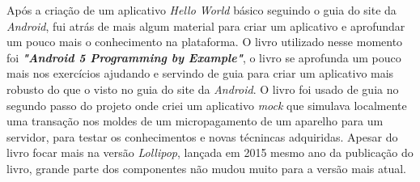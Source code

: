 \documentclass[hidelinks,12pt]{article}
\begin{document}
Ap\'os a cria\c{c}\~ao de um aplicativo \textit{Hello World} b\'asico seguindo o guia do site da \textit{Android}, fui atr\'as de mais algum material para criar um aplicativo e aprofundar um pouco mais o conhecimento na plataforma. O livro \cite{andppe} utilizado nesse momento foi \textbf{\textit{"Android 5 Programming by Example"}}, o livro \cite{andppe} se aprofunda um pouco mais nos exerc\'icios ajudando e servindo de guia para criar um aplicativo mais robusto do que o visto no guia do site da \textit{Android}. O livro \cite{andppe} foi usado de guia no segundo passo do projeto onde criei um aplicativo \textit{mock} que simulava localmente uma transa\c{c}\~ao nos moldes de um micropagamento de um aparelho para um servidor, para testar os conhecimentos e novas t\'ecnincas adquiridas. Apesar do livro \cite{andppe} focar mais na vers\~ao \textit{Lollipop}, lan\c{c}ada em 2015 mesmo ano da publica\c{c}\~ao do livro, grande parte dos componentes n\~ao mudou muito para a vers\~ao mais atual.
\newline
\end{document}
